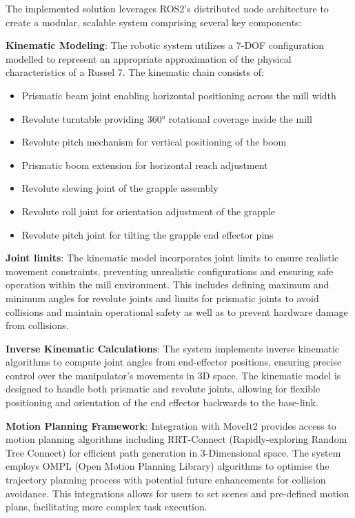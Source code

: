 \documentclass[10pt,a4paper,english]{article}
\begin{document}
The implemented solution leverages ROS2's distributed node architecture to create a modular, scalable system comprising several key components:

\textbf{Kinematic Modeling}: The robotic system utilizes a 7-DOF configuration modelled to represent an appropriate approximation of the physical characteristics of a Russel 7. The kinematic chain consists of:
\begin{itemize}
    \item Prismatic beam joint enabling horizontal positioning across the mill width
    \item Revolute turntable providing 360° rotational coverage inside the mill
    \item Revolute pitch mechanism for vertical positioning of the boom
    \item Prismatic boom extension for horizontal reach adjustment
    \item Revolute slewing joint of the grapple assembly
    \item Revolute roll joint for orientation adjustment of the grapple
    \item Revolute pitch joint for tilting the grapple end effector pins
\end{itemize}

\textbf{Joint limits}: The kinematic model incorporates joint limits to ensure realistic movement constraints, preventing unrealistic configurations and ensuring safe operation within the mill environment. This includes defining maximum and minimum angles for revolute joints and limits for prismatic joints to avoid collisions and maintain operational safety as well as to prevent hardware damage from collisions.

\textbf{Inverse Kinematic Calculations}: The system implements inverse kinematic algorithms to compute joint angles from end-effector positions, ensuring precise control over the manipulator's movements in 3D space. The kinematic model is designed to handle both prismatic and revolute joints, allowing for flexible positioning and orientation of the end effector backwards to the base-link.

\textbf{Motion Planning Framework}: Integration with MoveIt2 provides access to motion planning algorithms including RRT-Connect (Rapidly-exploring Random Tree Connect) for efficient path generation in 3-Dimensional space. The system employs OMPL (Open Motion Planning Library) algorithms to optimise the trajectory planning process with potential future enhancements for collision avoidance. This integrations allows for users to set scenes and pre-defined motion plans, facilitating more complex task execution.
\end{document}
